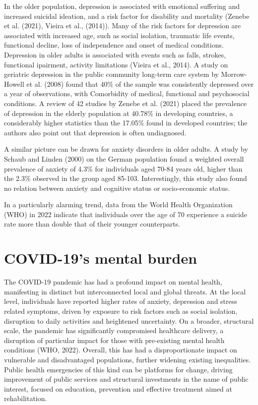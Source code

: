     In the older population, depression is associated with emotional suffering and increased suicidal ideation, and a risk factor for disability and mortality (Zenebe et al. (2021), Vieira et al., (2014)). Many of the risk factors for depression are associated with increased age, such as social isolation, traumatic life events, functional decline, loss of independence and onset of medical conditions. Depression in older adults is associated with events such as falls, strokes, functional ipairment, activity limitations (Vieira et al., 2014). A study on geriatric depression in the public community long-term care system by Morrow-Howell et al. (2008) found that 40\% of the sample was consistently depressed over a year of observations, with Comorbidity of medical, functional and psychosocial conditions. A review of 42 studies by Zenebe et al. (2021) placed the prevalence of depression in the elderly population at 40.78\% in developing countries, a considerably higher statistics than the 17.05\% found in developed countries; the authors also point out that depression is often undiagnosed.

    A similar picture can be drawn for anxiety disorders in older adults. A study by Schaub and Linden (2000) on the German population found a weighted overall prevalence of anxiety of 4.3\% for individuals aged 70-84 years old, higher than the 2.3\% observed in the group aged 85-103. Interestingly, this study also found no relation between anxiety and cognitive status or socio-economic status.

    In a particularly alarming trend, data from the World Health Organization (WHO) in 2022 indicate that individuals over the age of 70 experience a suicide rate more than double that of their younger counterparts.


 \section{COVID-19's mental burden}
    The COVID-19 pandemic has had a profound impact on mental health, manifesting in distinct but interconnected local and global threats. At the local level, individuals have reported higher rates of anxiety, depression and stress related symptoms, driven by exposure to risk factors such as social isolation, disruption to daily activities and heightened uncertainty. On a broader, structural scale, the pandemic has significantly compromised healthcare delivery, a disruption of particular impact for those with pre-existing mental health conditions (WHO, 2022). Overall, this has had a disproportionate impact on vulnerable and disadvantaged populations, further widening existing inequalities. 
    Public health emergencies of this kind can be platforms for change, driving improvement of public services and structural investments in the name of public interest, focused on education, prevention and effective treatment aimed at rehabilitation. 

